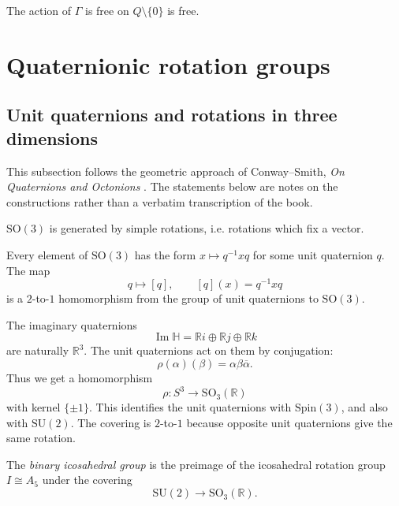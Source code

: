 \begin{lemma}
\label{lemma-action-is-free-outside-origin}
The action of $\Gamma$ is free on
$Q\setminus\{0\}$ is free.
\end{lemma}


\section{Quaternionic rotation groups}
\label{section-quaternionic-rotation-groups}

\subsection{Unit quaternions and rotations in three dimensions}
\label{subsection-unit-quaternions-rotations}

This subsection follows the geometric approach of Conway--Smith,
\emph{On Quaternions and Octonions}
\cite[Sections~4.1--4.2]{conway-smith-quaternions}.
The statements below are notes on the constructions rather than a
verbatim transcription of the book.

\begin{lemma}
\label{lemma-so3-simple-rotations}
$\text{SO}(3)$ is generated by simple
rotations, i.e. rotations which fix a
vector.
\end{lemma}

\begin{lemma}
\label{lemma-unit-quaternions-cover-so3}
Every element of $\text{SO}(3)$ has the form
$x \mapsto q^{-1}xq$ for some unit
quaternion $q$. The map
$$
q \longmapsto [q],
\qquad
[q](x)=q^{-1}xq
$$
is a $2$-to-$1$ homomorphism from the group
of unit quaternions to $\text{SO}(3)$.
\end{lemma}

\noindent
The imaginary quaternions
$$
\operatorname{Im}\mathbb{H}
=
\mathbb{R}i\oplus\mathbb{R}j
\oplus\mathbb{R}k
$$
are naturally $\mathbb{R}^3$. The unit
quaternions act on them by conjugation:
$$
\rho(\alpha)(\beta)
=
\alpha\beta\overline{\alpha}.
$$
Thus we get a homomorphism
$$
\rho:S^3 \longrightarrow
\text{SO}_3(\mathbb{R})
$$
with kernel $\{\pm 1\}$. This identifies the
unit quaternions with $\text{Spin}(3)$, and
also with $\text{SU}(2)$. The covering is
$2$-to-$1$ because opposite unit quaternions
give the same rotation.

\begin{definition}
\label{definition-binary-icosahedral}
The {\it binary icosahedral group} is the
preimage of the icosahedral rotation group
$I\cong A_5$ under the covering
$$
\text{SU}(2) \longrightarrow
\text{SO}_3(\mathbb{R}).
$$
\end{definition}

